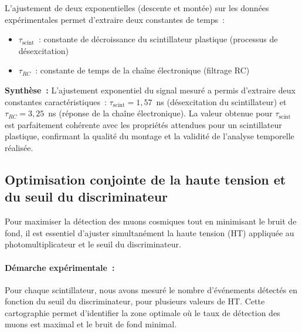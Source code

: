 \documentclass[a4paper,12pt,twoside]{article}
\begin{document}
L’ajustement de deux exponentielles (descente et montée) sur les données expérimentales permet d’extraire deux constantes de temps :
\begin{itemize}
    \item $\tau_{\text{scint}}$ : constante de décroissance du scintillateur plastique (processus de désexcitation)
    \item $\tau_{RC}$ : constante de temps de la chaîne électronique (filtrage RC)
\end{itemize}

\begin{remarque}
\textbf{Synthèse~:} L’ajustement exponentiel du signal mesuré a permis d’extraire deux constantes caractéristiques~: $\tau_{\text{scint}} = 1{,}57$~ns (désexcitation du scintillateur) et $\tau_{RC} = 3{,}25$~ns (réponse de la chaîne électronique). La valeur obtenue pour $\tau_{\text{scint}}$ est parfaitement cohérente avec les propriétés attendues pour un scintillateur plastique, confirmant la qualité du montage et la validité de l’analyse temporelle réalisée.
\end{remarque}

\subsection{Optimisation conjointe de la haute tension et du seuil du discriminateur}


\vspace{1em}
\begin{center}
\begin{tcolorbox}[colback=blue!5!white, colframe=blue!60!black, title=Optimisation conjointe des réglages électroniques]
Pour maximiser la détection des muons cosmiques tout en minimisant le bruit de fond, il est essentiel d’ajuster simultanément la haute tension (HT) appliquée au photomultiplicateur et le seuil du discriminateur.
\end{tcolorbox}
\end{center}


\paragraph{Démarche expérimentale~:}
Pour chaque scintillateur, nous avons mesuré le nombre d’événements détectés en fonction du seuil du discriminateur, pour plusieurs valeurs de HT. Cette cartographie permet d’identifier la zone optimale où le taux de détection des muons est maximal et le bruit de fond minimal.
\end{document}
